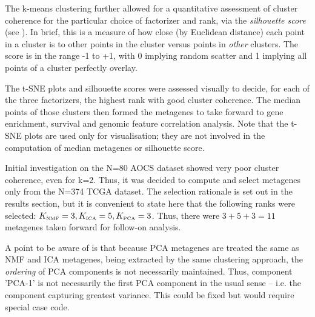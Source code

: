 \documentclass[tikz, 11pt,a4paper,oneside,fleqn, draft]{article}
\begin{document}
The k-means clustering further allowed for a quantitative assessment of cluster coherence for the particular choice of factorizer and rank, via the \emph{silhouette score} (see \cite{Wikipedia}).  In brief, this is a measure of how close (by Euclidean distance) each point in a cluster is to other points in the cluster versus points in \emph{other} clusters.  
The score is in the range -1 to +1, with 0 implying random scatter and 1 implying all points of a cluster perfectly overlay.

The t-SNE plots and silhouette scores were assessed visually to decide, for each of the three factorizers, the highest rank with good cluster coherence.  The median points of those clusters then formed the metagenes to take forward to gene enrichment, survival and genomic feature correlation analysis.   
Note that the t-SNE plots are used only for visualisation; they are not involved in the computation of median metagenes or silhouette score.

Initial investigation on the N=80 AOCS dataset showed very poor cluster coherence, even for k=2.   Thus, it was decided to compute and select metagenes only from the N=374 TCGA dataset.   
The selection rationale is set out in the results section, but it is convenient to state here that the following ranks were selected:
$K_{\mbox{\tiny NMF}} = 3, K_{\mbox{\tiny ICA}} = 5, K_{\mbox{\tiny PCA}} =3$.  Thus, there were $3 + 5 + 3 = 11$ metagenes taken forward for follow-on analysis.

A point to be aware of is that because PCA metagenes are treated the same as NMF and ICA metagenes, being extracted by the same clustering approach, the \emph{ordering} of PCA components is not necessarily maintained.   Thus, component 'PCA-1' is not necessarily the first PCA component  in the usual sense -- i.e. the component capturing greatest variance.  This could be fixed but would require special case code.
\end{document}
